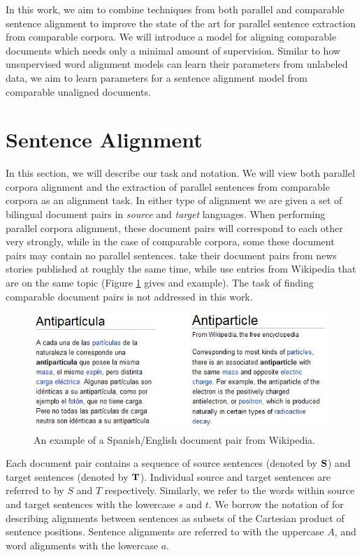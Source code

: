 \documentclass[11pt,letterpaper]{article}
\begin{document}
In this work, we aim to combine techniques from both parallel and comparable
sentence alignment to improve the state of the art for parallel sentence
extraction from comparable corpora. 
We will introduce a model for aligning comparable documents which
needs only a minimal amount of supervision. Similar to how unsupervised word
alignment models can learn their parameters from unlabeled data, we aim to learn
parameters for a sentence alignment model from comparable unaligned documents.

\section{Sentence Alignment}
In this section, we will describe our task and notation.
We will view both parallel corpora alignment and the extraction of parallel
sentences from comparable corpora as an alignment task. In either type of
alignment we are given a set of bilingual document pairs in {\em source} and {\em
target} languages. When performing parallel corpora alignment, these document
pairs will correspond to each other very strongly, while in the case of
comparable corpora, some these document pairs may contain no parallel sentences.
 take their document pairs from news stories published at
roughly the same time, while  use entries from
Wikipedia that are on the same topic (Figure \ref{fig:wiki} gives and example).
The task of finding comparable document pairs is not addressed in this work.

\begin{figure}[ht]
\includegraphics[width=\textwidth]{images/wiki.jpg}
\caption{An example of a Spanish/English document pair from Wikipedia.}
\label{fig:wiki}
\end{figure}

Each document pair contains a sequence of source sentences (denoted by ${\bf
S}$) and target sentences (denoted by ${\bf T}$). Individual source and target
sentences are referred to by $S$ and $T$ respectively. Similarly, we refer to
the words within source and target sentences with the lowercase $s$ and $t$. We
borrow the notation of \cite{Och03} for describing alignments between sentences
as subsets of the Cartesian product of sentence positions. Sentence alignments
are referred to with the uppercase $A$, and word alignments with the lowercase
$a$.
\end{document}
